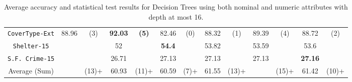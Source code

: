 \begin{table}
\begin{tabular}{c|cc|cc|cc|cc|cc|cc}
{\tt CoverType-Ext}  &  88.96         &  (3)              &  {\bf 92.03}&  {\bf (5)}    &  82.46       &  (0)               &  88.32      & (1)            & 89.39        & (4)       & 88.72        & (2)       \\
{\tt Shelter-15}     &                &                   &  52         &               &  {\bf 54.4}  &                    &  53.82      &                & 53.59        &           & 53.6         &           \\   
{\tt S.F. Crime-15}  &                &                   &  26.71      &               &  27.13       &                    &  27.13      &                & 27.13        &           & {\bf 27.16}  &           \\
\hline
Average (Sum)        &                &  (13)+            & 60.93       &  (11)+        &   60.59      &  (7)+              &  61.55      & (13)+          &              & (15)+     & 61.42        & (10)+

\end{tabular}
\caption{Average accuracy and statistical test results for  Decision Trees using both nominal and numeric attributes with depth at most 16.}
\label{exp:numeric-16}
\normalsize
\end{table}

